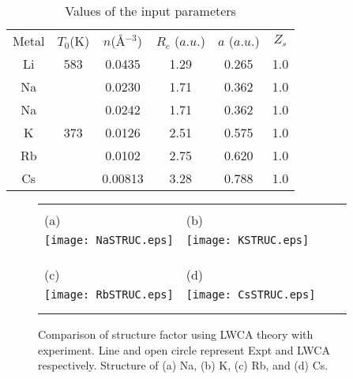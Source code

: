 \documentclass[final12pt]{elsarticle}
\begin{document}
\newpage
\begin{table}[htp]
\vskip -0.0cm
\begin{center}
\caption{Values of the input parameters}
\label{t1}
\vspace{7mm}
\begin{tabular}{cccccc}\hline
Metal & $T_{0}$(K)  & $n$(\AA$^{-3}$)   &  $R_{c}$ ($a.u.$)  &   $a$ ($a.u.$) & $Z_{s}$  \\ \cline{1-6}
Li   & 583      &  0.0435           &   1.29   & 0.265      &  1.0       \\
Na   &          & 0.0230            &   1.71   & 0.362      &  1.0       \\ \cline{1-6}
Na   &          & 0.0242            &   1.71   & 0.362      &  1.0       \\
K    & 373      & 0.0126            &   2.51   & 0.575      &  1.0          \\
Rb   &         & 0.0102             &   2.75    & 0.620      &  1.0        \\
Cs   &         & 0.00813            &   3.28    & 0.788     &  1.0        \\\hline
\end{tabular}
\end{center}
\end{table}

\begin{figure}[htp]
\begin{center}
\begin{tabular}{llll}
\vspace{-2.7cm}
 \\(a)& (b) \\
\texttt{[image: NaSTRUC.eps]}&
\texttt{[image: KSTRUC.eps]}\\&\\&\\
\vspace{-3.0cm}
\\(c) & (d) \\
\texttt{[image: RbSTRUC.eps]}&
\texttt{[image: CsSTRUC.eps]}\\&\\&\\

\end{tabular}
\caption{Comparison of structure factor using LWCA theory with experiment. Line and open circle represent Expt and LWCA respectively. Structure of (a) Na, (b) K, (c) Rb, and (d) Cs.}
\label{pfig1}
\end{center}
\end{figure}
\end{document}
